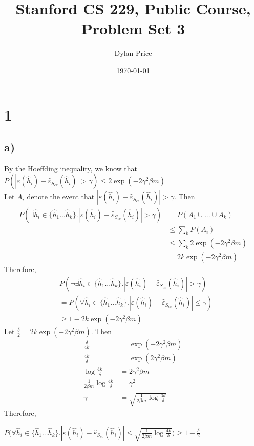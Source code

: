 \documentclass[11pt]{article}
\begin{document}
\title{Stanford CS 229, Public Course, Problem Set 3}
\date{\today}
\author{Dylan Price}
\maketitle 

\newcommand{\hhat}[1]{\hat{h}_#1}
\newcommand{\CvtError}[0]{\hat{\varepsilon}_{S_{cv}}}
\newcommand{\GError}[0]{\varepsilon}

\section*{1}

\subsection*{a)}
By the Hoeffding inequality, we know that \\

$P(|\GError(\hhat{i}) - \CvtError(\hhat{i})| > \gamma) \le 2\exp(-2 \gamma^2 \beta m) $ \\

Let $A_i$ denote the event that $|\GError(\hhat{i}) - \CvtError(\hhat{i})| > \gamma$. Then \\
\begin{align*}
    P(\exists \hhat{i} \in \{\hhat{1}...\hhat{k}\}. |\GError(\hhat{i}) - \CvtError(\hhat{i})| > \gamma) 
        &= P(A_1 \cup ... \cup A_k) \\
        &\le \sum_k P(A_i) \\
        &\le \sum_k 2\exp(-2 \gamma^2 \beta m) \\
        &= 2k \exp(-2 \gamma^2 \beta m)
\end{align*}
Therefore, \begin{align*}
    &P(\neg \exists \hhat{i} \in \{\hhat{1}...\hhat{k}\}. |\GError(\hhat{i}) - \CvtError(\hhat{i})| > \gamma) \\
    &= P(\forall \hhat{i} \in \{\hhat{1}...\hhat{k}\}. |\GError(\hhat{i}) - \CvtError(\hhat{i})| \le \gamma) \\
    &\geq 1 - 2k\exp(-2 \gamma^2 \beta m)
\end{align*}
Let $\frac{\delta}{2} = 2k\exp(-2 \gamma^2 \beta m)$. Then
\begin{align*}
                          \frac{\delta}{4k} &= \exp(-2 \gamma^2 \beta m) \\
                          \frac{4k}{\delta} &= \exp(2 \gamma^2 \beta m) \\
                     \log \frac{4k}{\delta} &= 2 \gamma^2 \beta m \\
 \frac{1}{2 \beta m} \log \frac{4k}{\delta} &= \gamma^2 \\
                                     \gamma &= \sqrt{\frac{1}{2 \beta m} \log \frac{4k}{\delta}}
\end{align*}
Therefore,

$P\Bigg(\forall \hhat{i} \in \{\hhat{1}...\hhat{k}\}. |\GError(\hhat{i}) - \CvtError(\hhat{i})| \le \sqrt{\frac{1}{2 \beta m} \log \frac{4k}{\delta}}\Bigg) \geq 1 - \frac{\delta}{2}$
\end{document}
